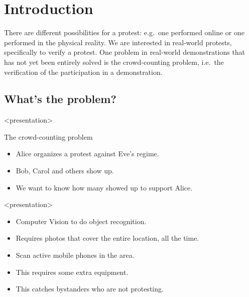 \mode*

\section{Introduction}
\label{Introduction}

There are different possibilities for a protest: e.g.\ one performed online or 
one performed in the physical reality.
We are interested in real-world protests, specifically to verify a protest.
One problem in real-world demonstrations that has not yet been entirely solved 
is the crowd-counting problem, i.e.\ the verification of the participation in 
a demonstration.

\subsection<presentation>{What's the problem?}

\begin{frame}<presentation>
  \begin{block}{The crowd-counting problem}
    \begin{itemize}
      \item Alice organizes a protest against Eve's regime.
      \item Bob, Carol and others show up.
      \item We want to know how many showed up to support Alice.
    \end{itemize}
  \end{block}
\end{frame}

\begin{frame}<presentation>
  \begin{example}
    \begin{itemize}
      \item Computer Vision to do object recognition.
      \item Requires photos that cover the entire location, all the time.
    \end{itemize}
  \end{example}

  \pause

  \begin{example}
    \begin{itemize}
      \item Scan active mobile phones in the area.
      \item This requires some extra equipment.
      \item This catches bystanders who are not protesting.
    \end{itemize}
  \end{example}
\end{frame}

